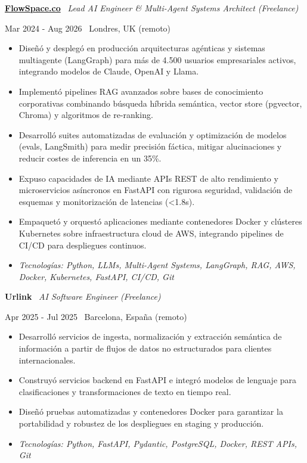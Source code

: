 \documentclass[a4paper,10pt]{article}
\newcommand{\role}[4]{%
  \vspace{2pt}\noindent
  \begin{minipage}[t]{0.70\textwidth}\raggedright\textbf{#1} \textbullet\ \textit{#3}\end{minipage}%
  \hfill
  \begin{minipage}[t]{0.28\textwidth}\raggedleft\footnotesize\color{gray}#2 \textbullet\ #4\end{minipage}%
  \vspace{1pt}%
}
\begin{document}
\role{\href{https://flowspace.co}{FlowSpace.co}}{Mar 2024 - Aug 2026}{Lead AI Engineer \& Multi-Agent Systems Architect (Freelance)}{Londres, UK (remoto)}
\begin{itemize}
  \item Diseñó y desplegó en producción arquitecturas agénticas y sistemas multiagente (LangGraph) para más de 4.500 usuarios empresariales activos, integrando modelos de Claude, OpenAI y Llama.
  \item Implementó pipelines RAG avanzados sobre bases de conocimiento corporativas combinando búsqueda híbrida semántica, vector store (pgvector, Chroma) y algoritmos de re-ranking.
  \item Desarrolló suites automatizadas de evaluación y optimización de modelos (evals, LangSmith) para medir precisión fáctica, mitigar alucinaciones y reducir costes de inferencia en un 35\%.
  \item Expuso capacidades de IA mediante APIs REST de alto rendimiento y microservicios asíncronos en FastAPI con rigurosa seguridad, validación de esquemas y monitorización de latencias (<1.8s).
  \item Empaquetó y orquestó aplicaciones mediante contenedores Docker y clústeres Kubernetes sobre infraestructura cloud de AWS, integrando pipelines de CI/CD para despliegues continuos.
  \item \textit{Tecnologías: Python, LLMs, Multi-Agent Systems, LangGraph, RAG, AWS, Docker, Kubernetes, FastAPI, CI/CD, Git}
\end{itemize}

\role{Urlink}{Apr 2025 - Jul 2025}{AI Software Engineer (Freelance)}{Barcelona, España (remoto)}
\begin{itemize}
  \item Desarrolló servicios de ingesta, normalización y extracción semántica de información a partir de flujos de datos no estructurados para clientes internacionales.
  \item Construyó servicios backend en FastAPI e integró modelos de lenguaje para clasificaciones y transformaciones de texto en tiempo real.
  \item Diseñó pruebas automatizadas y contenedores Docker para garantizar la portabilidad y robustez de los despliegues en staging y producción.
  \item \textit{Tecnologías: Python, FastAPI, Pydantic, PostgreSQL, Docker, REST APIs, Git}
\end{itemize}
\end{document}

